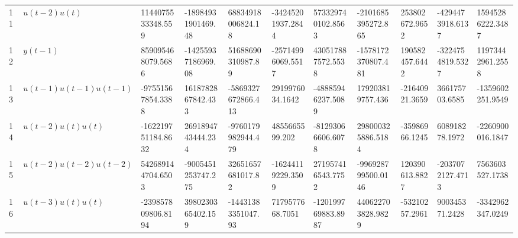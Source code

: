 \begin{tabular}{lllllllllll}
11 & $u(t-2)u(t)$ & 1144075533348.559 & -18984931901469.48 & 68834918006824.18 & -34245201937.2844 & 573329740102.8563 & -2101685395272.865 & 253802672.9652 & -4294473918.6137 & 15945286222.3487 \\ 
12 & $y(t-1)$ & 859095468079.5686 & -14255937186969.08 & 51688690310987.89 & -25714996069.5517 & 430517887572.5538 & -1578172370807.481 & 190582457.6442 & -3224754819.5327 & 11973442961.2558 \\ 
13 & $u(t-1)u(t-1)u(t-1)$ & -97551567854.3388 & 1618782867842.433 & -5869327672866.413 & 2919976034.1642 & -48885946237.5089 & 179203819757.436 & -21640921.3659 & 366175703.6585 & -1359602251.9549 \\ 
14 & $u(t-2)u(t)u(t)$ & -162219751184.8632 & 2691894743444.234 & -9760179982944.479 & 4855665599.202 & -81293066606.6078 & 298000325886.5184 & -35986966.1245 & 608918278.1972 & -2260900016.1847 \\ 
15 & $u(t-2)u(t-2)u(t-2)$ & 542689144704.6503 & -9005451253747.275 & 32651657681017.82 & -16244119229.3509 & 271957416543.7752 & -996928799500.0146 & 120390613.8827 & -2037072127.4713 & 7563603527.1738 \\ 
16 & $u(t-3)u(t)u(t)$ & -239857809806.8194 & 3980230365402.159 & -14431383351047.93 & 7179577668.7051 & -120199769883.8987 & 440622703828.9829 & -53210257.2961 & 900345371.2428 & -3342962347.0249 \\ 
\hline 
\end{tabular}